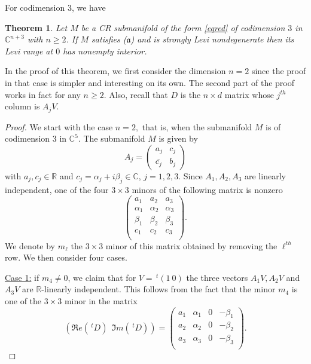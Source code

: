 \documentclass[10pt,a4paper]{amsart}
\newcommand{\C}{\mathbb C}
\newcommand{\R}{\mathbb R}
\newcommand{\transp}{\,^t}
\newtheorem{theo}{Theorem}[section]
\numberwithin{equation}{section}
\begin{document}
For codimension 3, we have  

\begin{theo}\label{theod=3}
Let $M$ be a CR submanifold of the form \eqref{eqred} of codimension $3$ in $\C^{n+3}$ with $n\geq 2$. If $M$ satisfies ($\mathfrak{a}$) and is strongly Levi nondegenerate then its Levi range at $0$ has nonempty interior. 
\end{theo}

In the proof of this theorem, we first consider the dimension  $n=2$ since the proof in that case is simpler and interesting on its own. The second part of the proof works in fact for any $n \geq 2$. Also, recall that $D$ is the $n\times d$ matrix whose $j^{th}$ column is $A_jV$.
    
\begin{proof} 
We start with the case  $n=2,$ that is, when the submanifold  $M$ is of codimension 3 in $\C^5$. The submanifold $M$ is given by 
$$A_j=\begin{pmatrix}a_j & c_j \\ \overline{c_j} & b_j \end{pmatrix}$$
with $a_j,c_j \in \R$ and $c_j=\alpha_j+i\beta_j \in \C$, $j=1,2,3$. Since $A_1,A_2,A_3$ are linearly independent, one of the four $3\times 3$ minors of the following matrix is nonzero
$$\begin{pmatrix}
a_1 & a_2 & a_3 \\ 
\alpha_1 & \alpha_2 & \alpha_3 \\ 
\beta_1 & \beta_2 & \beta_3 \\ 
c_1 & c_2 & c_3 \\ 
 \end{pmatrix}.$$
We denote by $m_\ell$ the $3\times 3$ minor of this matrix obtained by removing the $\ell^{th}$ row. We then consider four cases. 

\noindent \underline{Case 1:} if $m_4\neq 0$, we claim that for $V=\transp (1 \  0)$ the three vectors $A_1V,A_2V$ and $A_3V$ are $\R$-linearly independent. This follows from the fact that the 
minor $m_4$ is one of the $3\times 3$ minor in the matrix 
$$(\Re e (\transp D) \ \ \Im m  (\transp D))=\begin{pmatrix} 
a_1 & \alpha_1 & 0    & -\beta_1 \\ 
a_2 & \alpha_2 & 0   &-\beta_2  \\ 
a_3 & \alpha_3 & 0    & -\beta_3\\ 

\end{pmatrix}.$$  
  

\end{proof}
\end{document}
